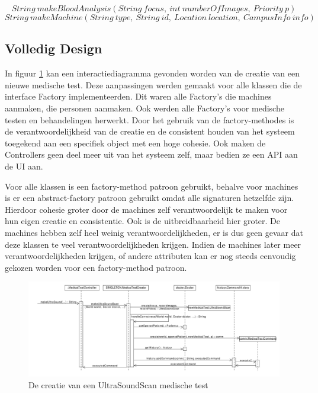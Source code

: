 \[ String\ makeBloodAnalysis(String\ focus,\ int\ numberOfImages,\ Priority\ p)\]
\[ String\ makeMachine(String\ type,\ String\ id,\ Location\ location,\ CampusInfo\ info)\]

\subsection{Volledig Design}
In figuur \ref{fig:makeUltraSound} kan een interactiediagramma gevonden worden van de creatie van een nieuwe medische test. 
Deze aanpassingen werden gemaakt voor alle klassen die de interface Factory implementeerden. 
Dit waren alle Factory's die machines aanmaken, die personen aanmaken. 
Ook werden alle Factory's voor medische testen en behandelingen herwerkt. 
Door het gebruik van de factory-methodes is de verantwoordelijkheid van de creatie en de consistent houden van het systeem toegekend aan een specifiek object met een hoge cohesie.
Ook maken de Controllers geen deel meer uit van het systeem zelf, maar bedien ze een API aan de UI aan. 

Voor alle klassen is een factory-method patroon gebruikt, behalve voor machines is er een abstract-factory patroon gebruikt omdat alle signaturen hetzelfde zijn. 
Hierdoor cohesie groter door de machines zelf verantwoordelijk te maken voor hun eigen creatie en consistentie. 
Ook is de uitbreidbaarheid hier groter.
De machines hebben zelf heel weinig verantwoordelijkheden, er is dus geen gevaar dat deze klassen te veel verantwoordelijkheden krijgen. 
Indien de machines later meer verantwoordelijkheden krijgen, of andere attributen kan er nog steeds eenvoudig gekozen worden voor een factory-method patroon.

\begin{figure}

\hspace{-2.5cm}
 \includegraphics[width=1.3\textwidth]{./exported/interaction/makeUtraSound.pdf}
\caption{De creatie van een UltraSoundScan medische test \label{fig:makeUltraSound}}

\end{figure} 

